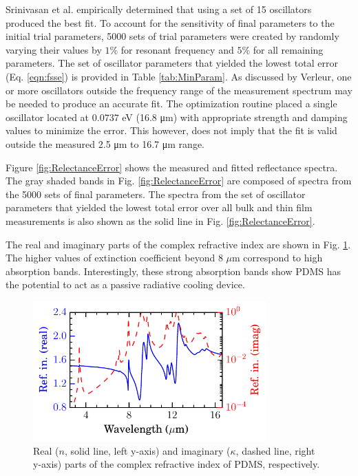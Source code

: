 Srinivasan et al. empirically determined that using a set of 15 oscillators produced the best fit. To account for the sensitivity of final parameters to  the initial trial parameters, 5000 sets of trial parameters were created by randomly varying their values by $1 \%$ for resonant frequency and $5 \%$ for all remaining parameters. The set of oscillator parameters that yielded the lowest total error (Eq. \ref{eqn:fsse}) is provided in Table \ref{tab:MinParam}. As discussed by Verleur,\cite{Verleur1968} one or more oscillators outside the frequency range of the measurement spectrum may be needed to produce an accurate fit. The optimization routine placed a single oscillator located at $0.0737$ eV (16.8 \si{\micro\meter}) with appropriate strength and damping values to minimize the error. This however, does not imply that the fit is valid outside the measured 2.5 \si{\micro\meter} to 16.7 \si{\micro\meter} range.

Figure \ref{fig:RelectanceError} shows the measured and fitted reflectance spectra. The gray shaded bands in Fig. \ref{fig:RelectanceError} are composed of spectra from the 5000 sets of final parameters. The spectra from the set of oscillator parameters that yielded the lowest total error over all bulk and thin film measurements is also shown as the solid line in Fig. \ref{fig:RelectanceError}.

The real and imaginary parts of the complex refractive index are shown in Fig. \ref{fig:RefInd}. The higher values of extinction coefficient beyond $8$ $\mu$m correspond to high absorption bands.\cite{Cai2010} Interestingly, these strong absorption bands show PDMS has the potential to act as a passive radiative cooling device.\cite{Czapla2017a}

\begin{figure}
\centering
\includegraphics[width=0.8\textwidth]{./Figures/PDMS_RefractiveIndex.pdf}
\caption{\label{fig:RefInd}Real ($n$, solid line, left y-axis) and imaginary ($\kappa$, dashed line, right y-axis) parts of the complex refractive index of PDMS, respectively.}
\end{figure}

